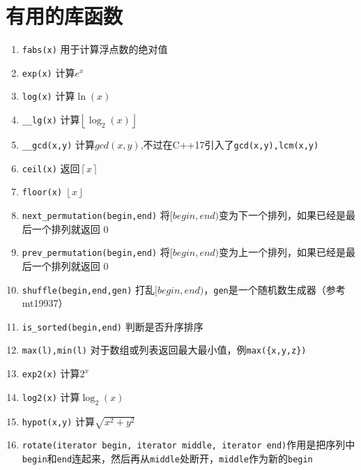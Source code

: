 \section{有用的库函数}


\begin{enumerate}
    \item \verb|fabs(x)| 用于计算浮点数的绝对值
    \item \verb|exp(x)| 计算$e^x$
    \item \verb|log(x)| 计算$\ln(x)$
    \item \verb|__lg(x)| 计算$\left \lfloor \log_2(x) \right \rfloor $
    \item \verb|__gcd(x,y)| 计算$gcd(x,y)$,不过在C++17引入了\verb|gcd(x,y),lcm(x,y)|
    \item \verb|ceil(x)| 返回$\left \lceil x \right \rceil$
    \item \verb|floor(x)| $\left \lfloor x \right \rfloor$
    \item \verb|next_permutation(begin,end)| 将$[begin,end)$变为下一个排列，如果已经是最后一个排列就返回 0
    \item \verb|prev_permutation(begin,end)| 将$[begin,end)$变为上一个排列，如果已经是最后一个排列就返回 0
    \item \verb|shuffle(begin,end,gen)| 打乱$[begin,end)$，\verb|gen|是一个随机数生成器（参考mt19937）
    \item \verb|is_sorted(begin,end)| 判断是否升序排序
    \item \verb|max(l),min(l)| 对于数组或列表返回最大最小值，例\verb|max({x,y,z})|
    \item \verb|exp2(x)| 计算$2^x$
    \item \verb|log2(x)| 计算$\log_2(x)$
    \item \verb|hypot(x,y)| 计算$\sqrt{x^2+y^2}$
    \item \verb|rotate(iterator begin, iterator middle, iterator end)|作用是把序列中\verb|begin|和\verb|end|连起来，然后再从\verb|middle|处断开，\verb|middle|作为新的\verb|begin|
\end{enumerate}


